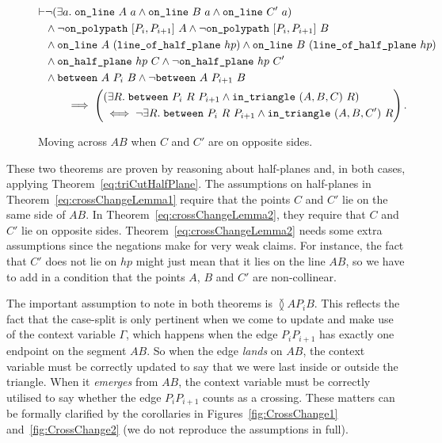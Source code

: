 \begin{figure}
\begin{multline}\label{eq:crossChangeLemma2}
  \begin{aligned}
    \vdash&\neg(\exists a.\; \texttt{on\_line}\ A\ a\wedge \texttt{on\_line}\ B\ a\wedge \texttt{on\_line}\ C'\ a)\\
    &\wedge \neg\texttt{on\_polypath}\ [P_i, P_{i+1}]\ A \wedge \neg\texttt{on\_polypath}\ [P_i, P_{i+1}]\ B\\
    &\wedge\texttt{on\_line}\ A\ (\texttt{line\_of\_half\_plane}\ hp) \wedge \texttt{on\_line}\ B\ (\texttt{line\_of\_half\_plane}\ hp)\\
    &\wedge\texttt{on\_half\_plane}\ hp\ C \wedge \neg\texttt{on\_half\_plane}\ hp\ C'\\
    &\wedge \texttt{between}\ A\ P_i\ B \wedge \neg\texttt{between}\ A\ P_{i+1}\ B
  \end{aligned}\\
  \implies\left(\begin{aligned}
      &(\exists R.\; \texttt{between}\ P_i\ R\ P_{i+1} \wedge \texttt{in\_triangle}\ (A,B,C)\ R)\\
      &\iff\neg \exists R.\; \texttt{between}\ P_i\ R\ P_{i+1} \wedge \texttt{in\_triangle}\ (A,B,C')\ R
  \end{aligned}\right).
\end{multline}
\caption{Moving across $AB$ when $C$ and $C'$ are on opposite sides.}
\label{fig:crossChangeLemma2}
\end{figure}

These two theorems are proven by reasoning about half-planes and, in both cases, applying Theorem~\ref{eq:triCutHalfPlane}. The assumptions on half-planes in Theorem~\ref{eq:crossChangeLemma1} require that the points $C$ and $C'$ lie on the same side of $AB$. In Theorem~\ref{eq:crossChangeLemma2}, they require that $C$ and $C'$ lie on opposite sides. Theorem~\ref{eq:crossChangeLemma2} needs some extra assumptions since the negations make for very weak claims. For instance, the fact that $C'$ does not lie on $hp$ might just mean that it lies on the line $AB$, so we have to add in a condition that the points $A$, $B$ and $C'$ are non-collinear.

The important assumption to note in both theorems is $\between{A}{P_i}{B}$. This reflects the fact that the case-split is only pertinent when we come to update and make use of the context variable $\Gamma$, which happens when the edge $P_iP_{i+1}$ has exactly one endpoint on the segment $AB$. So when the edge \emph{lands} on $AB$, the context variable must be correctly updated to say that we were last inside or outside the triangle. When it \emph{emerges} from $AB$, the context variable must be correctly utilised to say whether the edge $P_iP_{i+1}$ counts as a crossing. These matters can be formally clarified by the corollaries in Figures~\ref{fig:CrossChange1} and~\ref{fig:CrossChange2} (we do not reproduce the assumptions in full).

